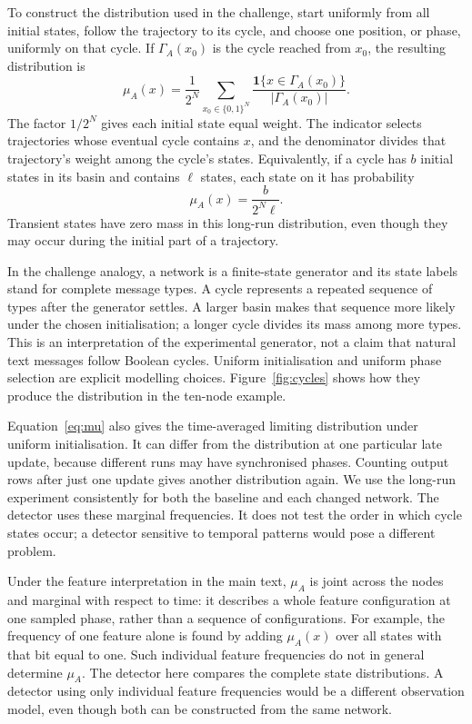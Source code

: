 \documentclass[11pt,a4paper]{article}
\newcommand{\bits}{\{0,1\}}
\begin{document}
To construct the distribution used in the challenge, start uniformly from
all initial states, follow the trajectory to its cycle, and choose one
position, or phase, uniformly on that cycle. If $\Gamma_A(x_0)$ is the cycle
reached from $x_0$, the resulting distribution is
\begin{equation}\label{eq:mu}
 \mu_A(x)=\frac{1}{2^N}\sum_{x_0\in\bits^N}
 \frac{\mathbf{1}\{x\in\Gamma_A(x_0)\}}{|\Gamma_A(x_0)|}.
\end{equation}
The factor $1/2^N$ gives each initial state equal weight. The indicator
selects trajectories whose eventual cycle contains $x$, and the
denominator divides that trajectory's weight among the cycle's states.
Equivalently, if a cycle has $b$ initial states in its basin and contains
$\ell$ states, each state on it has probability
\[
 \mu_A(x)=\frac{b}{2^N\ell}.
\]
Transient states have zero mass in this long-run distribution, even
though they may occur during the initial part of a trajectory.

In the challenge analogy, a network is a finite-state generator and its
state labels stand for complete message types. A cycle represents a repeated
sequence of types after the generator settles. A larger basin makes
that sequence more likely under the chosen initialisation; a longer
cycle divides its mass among more types. This is an interpretation
of the experimental generator, not a claim that natural text messages
follow Boolean cycles. Uniform initialisation and uniform phase selection
are explicit modelling choices. Figure~\ref{fig:cycles} shows how they
produce the distribution in the ten-node example.

Equation~\eqref{eq:mu} also gives the time-averaged limiting distribution
under uniform initialisation. It can differ from the distribution at one
particular late update, because different runs may have synchronised
phases. Counting output rows after just one update gives another
distribution again. We use the long-run experiment consistently for
both the baseline and each changed network.
The detector uses these marginal frequencies. It does not test the order
in which cycle states occur; a detector sensitive to temporal patterns
would pose a different problem.

Under the feature interpretation in the main text, $\mu_A$ is joint
across the nodes and marginal with respect to time: it describes a whole
feature configuration at one sampled phase, rather than a sequence of
configurations. For example, the frequency of one feature alone is found
by adding $\mu_A(x)$ over all states with that bit equal to one. Such
individual feature frequencies do not in general determine $\mu_A$.
The detector here compares the complete state distributions. A detector
using only individual feature frequencies would be a different observation
model, even though both can be constructed from the same network.
\end{document}
